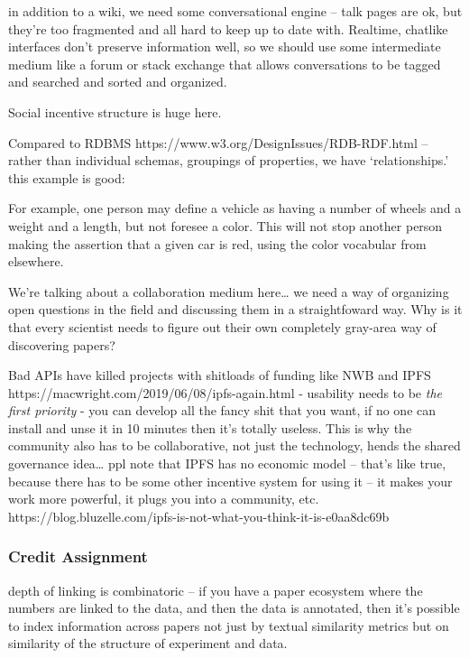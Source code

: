 \documentclass{article}
\begin{document}
in addition to a wiki, we need some conversational engine -- talk pages
are ok, but they're too fragmented and all hard to keep up to date with.
Realtime, chatlike interfaces don't preserve information well, so we
should use some intermediate medium like a forum or stack exchange that
allows conversations to be tagged and searched and sorted and organized.

Social incentive structure is huge here.

Compared to RDBMS https://www.w3.org/DesignIssues/RDB-RDF.html -- rather
than individual schemas, groupings of properties, we have
`relationships.' this example is good:

\begin{leftbar}
For example, one person may define a vehicle as having a number of
wheels and a weight and a length, but not foresee a color. This will not
stop another person making the assertion that a given car is red, using
the color vocabular from elsewhere.
\end{leftbar}

We're talking about a collaboration medium here\ldots{} we need a way of
organizing open questions in the field and discussing them in a
straightfoward way. Why is it that every scientist needs to figure out
their own completely gray-area way of discovering papers?

Bad APIs have killed projects with shitloads of funding like NWB and
IPFS https://macwright.com/2019/06/08/ipfs-again.html - usability needs
to be \emph{the first priority} - you can develop all the fancy shit
that you want, if no one can install and unse it in 10 minutes then it's
totally useless. This is why the community also has to be collaborative,
not just the technology, hends the shared governance idea\ldots{} ppl
note that IPFS has no economic model -- that's like true, because there
has to be some other incentive system for using it -- it makes your work
more powerful, it plugs you into a community, etc.
https://blog.bluzelle.com/ipfs-is-not-what-you-think-it-is-e0aa8dc69b

\hypertarget{credit-assignment}{%
\subsubsection{Credit Assignment}\label{credit-assignment}}

depth of linking is combinatoric -- if you have a paper ecosystem where
the numbers are linked to the data, and then the data is annotated, then
it's possible to index information across papers not just by textual
similarity metrics but on similarity of the structure of experiment and
data.
\end{document}

